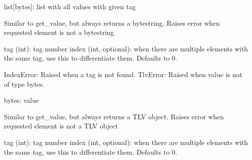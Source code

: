 \documentclass[letterpaper,10pt,english]{sphinxmanual}
\begin{document}
\begin{fulllineitems}
\begin{fulllineitems}
\begin{description}
\sphinxAtStartPar
list{[}bytes{]}: list with all values with given tag

\end{description}

\end{fulllineitems}


\begin{fulllineitems}
\label{\detokenize{aliro_actuator.access_protocol.tlv:aliro_actuator.access_protocol.tlv.TLV.get_bytes}}
\pysigstartsignatures
{}
\pysigstopsignatures
\sphinxAtStartPar
Similar to get\_value, but always returns a bytestring.
Raises error when requested element is not a bytestring
\begin{description}
\sphinxAtStartPar
tag (int): tag number
index (int, optional): when there are multiple elements with the same tag,
use this to differentiate them. Defaults to 0.

\sphinxAtStartPar
IndexError: Raised when a tag is not found.
TlvError: Raised when value is not of type bytes.

\sphinxAtStartPar
bytes: value

\end{description}

\end{fulllineitems}


\begin{fulllineitems}
\label{\detokenize{aliro_actuator.access_protocol.tlv:aliro_actuator.access_protocol.tlv.TLV.get_tlv}}
\pysigstartsignatures
{}
\pysigstopsignatures
\sphinxAtStartPar
Similar to get\_value, but always returns a TLV object.
Raises error when requested element is not a TLV object
\begin{description}
\sphinxAtStartPar
tag (int): tag number
index (int, optional): when there are multiple elements with the same tag,
use this to differentiate them. Defaults to 0.


\end{description}
\end{fulllineitems}
\end{fulllineitems}
\end{document}
